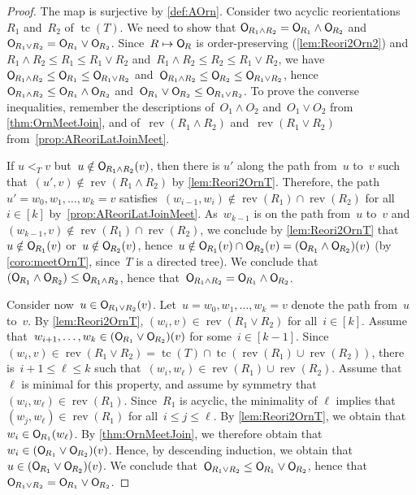 \documentclass{amsart}
\theoremstyle{definition}
\DeclareMathOperator{\tc}{tc} %
\newcommand{\meet}{\wedge} %
\newcommand{\join}{\vee} %
\newcommand{\mymap}[2]{\mathsf{#1}_{\hspace{-.7pt}#2}}
\newcommand{\orn}[1]{\mymap{O}{#1}}  %
\DeclareMathOperator{\rev}{rev} %
\begin{document}
\begin{proof}
The map is surjective by \cref{def:AOrn}.
Consider two acyclic reorientations~$R_1$ and~$R_2$ of $\tc(T)$.
We need to show that ${\orn{R_1 \meet R_2} = \orn{R_1} \meet \orn{R_2}}$ and~$\orn{R_1 \join R_2} = \orn{R_1} \join \orn{R_2}$.
Since~$R \mapsto \orn{R}$ is order-preserving (\cref{lem:Reori2Orn2}) and~$R_1 \meet R_2 \le R_1 \le R_1 \join R_2$ and~$R_1 \meet R_2 \le R_2 \le R_1 \join R_2$, we have~$\orn{R_1 \meet R_2} \le \orn{R_1} \le \orn{R_1 \join R_2}$ and~$\orn{R_1 \meet R_2} \le \orn{R_2} \le \orn{R_1 \join R_2}$, hence~${\orn{R_1 \meet R_2} \le \orn{R_1} \meet \orn{R_2}}$ and~${\orn{R_1} \join \orn{R_2} \le \orn{R_1 \join R_2}}$.
To prove the converse inequalities, remember the descriptions of~${O_1 \meet O_2}$ and~${O_1 \join O_2}$ from \cref{thm:OrnMeetJoin}, and of~$\rev(R_1 \meet R_2)$ and~$\rev(R_1 \join R_2)$ from~\cref{prop:AReoriLatJoinMeet}.

If $u <_T v$ but~$u \notin \orn{R_1 \meet R_2}(v)$, then there is $u'$ along the path from~$u$ to~$v$ such that~$(u',v) \notin \rev(R_1 \meet R_2)$ by \cref{lem:Reori2OrnT}.
Therefore, the path~$u' = w_0, w_1, \dots, w_k = v$ satisfies~$(w_{i-1}, w_i) \notin \rev(R_1) \cap \rev(R_2)$ for all $i \in [k]$ by~\cref{prop:AReoriLatJoinMeet}.
As~$w_{k-1}$ is on the path from~$u$ to~$v$ and~$(w_{k-1},v) \notin \rev(R_1) \cap \rev(R_2)$, we conclude by \cref{lem:Reori2OrnT} that~$u \notin \orn{R_1}(v)$ or~$u \notin \orn{R_2}(v)$, hence~$u \notin \orn{R_1}(v) \cap \orn{R_2}(v) = (\orn{R_1} \meet \orn{R_2})(v)$ (by \cref{coro:meetOrnT}, since~$T$ is a directed tree).
We conclude that~$(\orn{R_1} \meet \orn{R_2}) \le \orn{R_1 \meet R_2}$, hence that~$\orn{R_1 \meet R_2} = \orn{R_1} \meet \orn{R_2}$.

Consider now~$u \in \orn{R_1 \join R_2}(v)$.
Let~$u = w_0, w_1, \dots, w_k = v$ denote the path from~$u$ to~$v$.
By \cref{lem:Reori2OrnT}, $(w_i, v) \in \rev(R_1 \join R_2)$ for all~$i \in [k]$.
Assume that~$w_{i+1}, \dots, w_k \in (\orn{R_1} \join \orn{R_2})(v)$ for some~$i \in [k-1]$.
Since~$(w_i, v) \in \rev(R_1 \join R_2) = \tc(T) \cap \tc(\rev(R_1) \cup \rev(R_2))$, there is~${i+1 \le \ell \le k}$ such that~$(w_i, w_\ell) \in \rev(R_1) \cup \rev(R_2)$.
Assume that~$\ell$ is minimal for this property, and assume by symmetry that~$(w_i, w_\ell) \in \rev(R_1)$.
Since~$R_1$ is acyclic, the minimality of $\ell$ implies that~$(w_j, w_\ell) \in \rev(R_1)$ for all~${i \le j \le \ell}$.
By \cref{lem:Reori2OrnT}, we obtain that~$w_i \in \orn{R_1}(w_\ell)$.
By \cref{thm:OrnMeetJoin}, we therefore obtain that~${w_i \in (\orn{R_1} \join \orn{R_2})(v)}$.
Hence, by descending induction, we obtain that~$u \in (\orn{R_1} \join \orn{R_2})(v)$.
We conclude that~$\orn{R_1 \join R_2} \le \orn{R_1} \join \orn{R_2}$, hence that~${\orn{R_1 \join R_2} = \orn{R_1} \join \orn{R_2}}$.
\end{proof}
\end{document}
